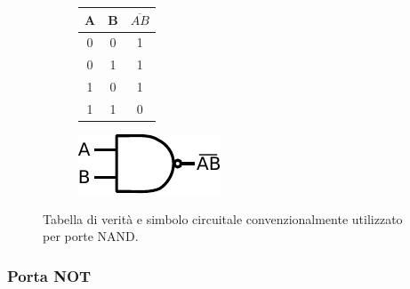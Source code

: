 \begin{figure}[htpc]
\centering
	\begin{subfigure}[hc]{.4\textwidth}
		\centering
		{\renewcommand{\arraystretch}{1.2}%
		\begin{tabular}{|c|c|c|}
		\hline
		A & B & $\overline{AB}$ \\
		\hline
		0 & 0 & 1\\
		\hline
		0 & 1 & 1\\
		\hline
		1 & 0 & 1\\
		\hline
		1 & 1 & 0\\
		\hline
		\end{tabular}}
		\label{tab9:NAND}
        \end{subfigure}
        \begin{subfigure}[hc]{.4\textwidth}
		\centering
		\includegraphics[width=.35\textwidth]{../E09/latex/NAND.pdf}
		\label{cir9:nand}
        \end{subfigure}
\caption{Tabella di verità e simbolo circuitale convenzionalmente utilizzato per porte NAND.}
\end{figure}


\subsubsection{Porta NOT}

